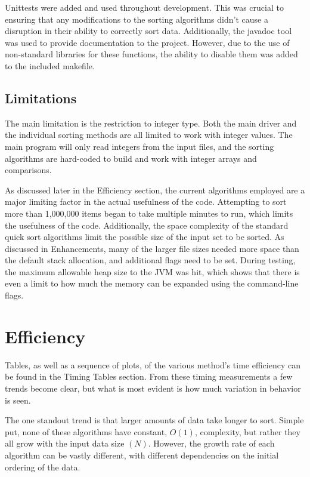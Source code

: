 \documentclass[a4paper,12pt]{article}
\begin{document}
Unittests were added and used throughout development.  This was crucial to ensuring that any modifications to the sorting algorithms didn't cause a disruption in their ability to correctly sort data.  Additionally, the javadoc tool was used to provide documentation to the project.  However, due to the use of non-standard libraries for these functions, the ability to disable them was added to the included makefile.


\subsection{Limitations}
The main limitation is the restriction to integer type.  Both the main driver and the individual sorting methods are all limited to work with integer values.  The main program will only read integers from the input files, and the sorting algorithms are hard-coded to build and work with integer arrays and comparisons.  

As discussed later in the Efficiency section, the current algorithms employed are a major limiting factor in the actual usefulness of the code.  Attempting to sort more than 1,000,000 items began to take multiple minutes to run, which limits the usefulness of the code.  Additionally, the space complexity of the standard quick sort algorithms limit the possible size of the input set to be sorted.  As discussed in Enhancements, many of the larger file sizes needed more space than the default stack allocation, and additional flags need to be set.  During testing, the maximum allowable heap size to the JVM was hit, which shows that there is even a limit to how much the memory can be expanded using the command-line flags.


\section{Efficiency}

Tables, as well as a sequence of plots, of the various method's time efficiency can be found in the Timing Tables section.  From these timing measurements a few trends become clear, but what is most evident is how much variation in behavior is seen.

The one standout trend is that larger amounts of data take longer to sort.  Simple put, none of these algorithms have constant, $O(1)$, complexity, but rather they all grow with the input data size $(N)$.  However, the growth rate of each algorithm can be vastly different, with different dependencies on the initial ordering of the data.
 
\end{document}
